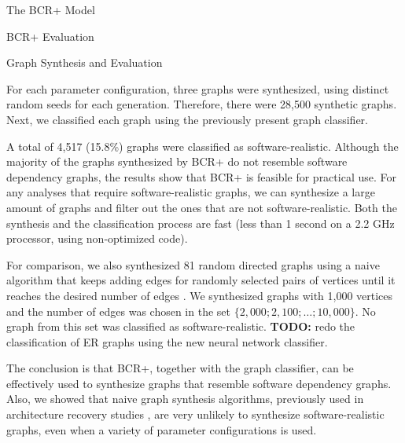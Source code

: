 \documentclass[11pt,twocolumn,a4paper,english]{article}
\newcommand{\TODO}{\textbf{TODO:} }
\begin{document}
\begin{section}{The BCR+ Model}
\begin{subsection}{BCR+ Evaluation}
\begin{subsubsection}{Graph Synthesis and Evaluation}
	
	For each parameter configuration, three graphs were synthesized, using distinct random seeds for each generation. Therefore, there were 28,500 synthetic graphs. Next, we classified each graph using the previously present graph classifier.

	
	A total of 4,517 (15.8\%) graphs were classified as software-realistic. Although the majority of the graphs synthesized by BCR+ do not resemble software dependency graphs, the results show that BCR+ is feasible for practical use. For any analyses that require software-realistic graphs, we can synthesize a large amount of graphs and filter out the ones that are not software-realistic. Both the synthesis and the classification process are fast (less than 1 second on a 2.2 GHz processor, using non-optimized code).

	For comparison, we also synthesized 81 random directed graphs using a naive algorithm that keeps adding edges for randomly selected pairs of vertices until it reaches the desired number of edges \cite{Erdos1959}. We synthesized graphs with 1,000 vertices and the number of edges was chosen in the set $\{2,000; 2,100; \ldots ; 10,000\}$. No graph from this set was classified as software-realistic. \TODO redo the classification of ER graphs using the new neural network classifier.

	The conclusion is that BCR+, together with the graph classifier, can be effectively used to synthesize graphs that resemble software dependency graphs. Also, we showed that naive graph synthesis algorithms, previously used in architecture recovery studies \cite{Mitchell2007}, are very unlikely to synthesize software-realistic graphs, even when a variety of parameter configurations is used.
	
	
	
\end{subsubsection}

\end{subsection}	
\end{section}
\end{document}
